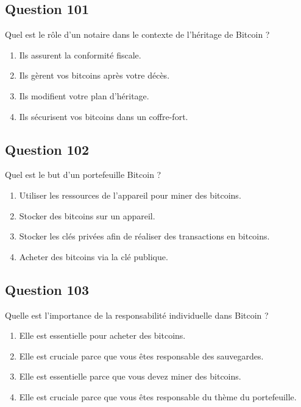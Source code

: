 \documentclass[12pt,a4paper]{article}
\begin{document}
\bigskip


\subsection*{Question 101}
Quel est le rôle d'un notaire dans le contexte de l'héritage de Bitcoin ?

\begin{enumerate}[label=\Alph*., leftmargin=*]
\item Ils assurent la conformité fiscale.
\item Ils gèrent vos bitcoins après votre décès.
\item Ils modifient votre plan d'héritage.
\item Ils sécurisent vos bitcoins dans un coffre-fort.
\end{enumerate}

\bigskip


\subsection*{Question 102}
Quel est le but d'un portefeuille Bitcoin ?

\begin{enumerate}[label=\Alph*., leftmargin=*]
\item Utiliser les ressources de l'appareil pour miner des bitcoins.
\item Stocker des bitcoins sur un appareil.
\item Stocker les clés privées afin de réaliser des transactions en bitcoins.
\item Acheter des bitcoins via la clé publique.
\end{enumerate}

\bigskip


\subsection*{Question 103}
Quelle est l'importance de la responsabilité individuelle dans Bitcoin ?

\begin{enumerate}[label=\Alph*., leftmargin=*]
\item Elle est essentielle pour acheter des bitcoins.
\item Elle est cruciale parce que vous êtes responsable des sauvegardes.
\item Elle est essentielle parce que vous devez miner des bitcoins.
\item Elle est cruciale parce que vous êtes responsable du thème du portefeuille.
\end{enumerate}
\end{document}
